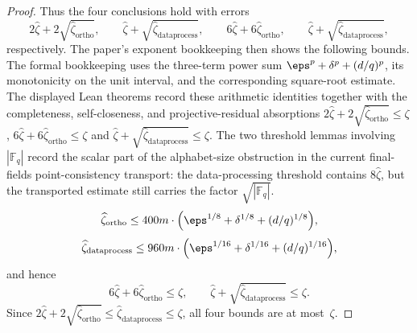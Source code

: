 \begin{proof}
  Thus the four conclusions hold with errors
  \[
    2\widehat{\zeta} + 2\sqrt{\widehat{\zeta}_{\mathrm{ortho}}},
    \qquad
    \widehat{\zeta} + \sqrt{\widehat{\zeta}_{\mathrm{dataprocess}}},
    \qquad
    6 \widehat{\zeta} + 6\widehat{\zeta}_{\mathrm{ortho}},
    \qquad
    \widehat{\zeta} + \sqrt{\widehat{\zeta}_{\mathrm{dataprocess}}},
  \]
  respectively. The paper's exponent bookkeeping then shows the following
  bounds. The formal bookkeeping uses the three-term power sum
  $\eps^p + \delta^p + (d/q)^p$, its monotonicity on the unit interval, and the
  corresponding square-root estimate. The displayed Lean theorems record these
  arithmetic identities together with the completeness, self-closeness, and
  projective-residual absorptions
  $2 \widehat{\zeta} + 2\sqrt{\widehat{\zeta}_{\mathrm{ortho}}} \le \zeta$,
  $6 \widehat{\zeta} + 6\widehat{\zeta}_{\mathrm{ortho}} \le \zeta$ and
  $\widehat{\zeta} + \sqrt{\widehat{\zeta}_{\mathrm{dataprocess}}} \le \zeta$.
  The two threshold lemmas involving \(|\mathbb F_q|\) record the scalar part of
  the alphabet-size obstruction in the current final-fields point-consistency
  transport: the data-processing threshold contains \(8\widehat{\zeta}\), but
  the transported estimate still carries the factor \(\sqrt{|\mathbb F_q|}\).
  \[
    \widehat{\zeta}_{\mathrm{ortho}}
    \leq 400 m \cdot \Big(\eps^{1/8} + \delta^{1/8} + (d/q)^{1/8}\Big),
  \]
  \[
    \widehat{\zeta}_{\mathrm{dataprocess}}
    \leq 960m \cdot \Big(\eps^{1/16} + \delta^{1/16} + (d/q)^{1/16}\Big),
  \]
  and hence
  \[
    6 \widehat{\zeta} + 6\widehat{\zeta}_{\mathrm{ortho}} \le \zeta,
    \qquad
    \widehat{\zeta} + \sqrt{\widehat{\zeta}_{\mathrm{dataprocess}}} \le \zeta.
  \]
  Since $2\widehat{\zeta} + 2\sqrt{\widehat{\zeta}_{\mathrm{ortho}}} \le \widehat{\zeta}_{\mathrm{dataprocess}} \le \zeta$, all four bounds are at most~$\zeta$.
\end{proof}


